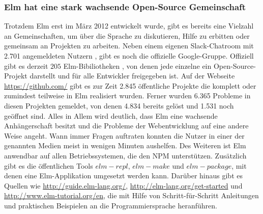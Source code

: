\subsubsection{Elm hat eine stark wachsende Open-Source Gemeinschaft}
Trotzdem Elm erst im März 2012 entwickelt wurde, gibt es bereits eine Vielzahl an Gemeinschaften, um über die Sprache zu diskutieren, Hilfe zu erbitten oder gemeinsam an Projekten zu arbeiten. Neben einem eigenen Slack-Chatroom mit 2.701 angemeldeten Nutzern \cite[vgl.]{slack-user}, gibt es noch die offizielle Google-Gruppe. Offiziell gibt es derzeit $205$ Elm-Bibiliotheken \cite[vgl.]{elm-package}, von denen jede einzelne ein Open-Source-Projekt darstellt und für alle Entwickler freigegeben ist. Auf der Webseite \url{https://github.com/} gibt es zur Zeit 2.845 öffentliche Projekte \cite[vgl.]{elm-repositories} die komplett oder zumindest teilweise in Elm realisiert wurden. Ferner wurden 6.365 Probleme in diesen Projekten gemeldet, von denen 4.834 bereits gelöst und 1.531 noch geöffnet sind.  Alles in Allem wird deutlich, dass Elm eine wachsende Anhängerschaft besitzt und die Probleme der Webentwicklung auf eine andere Weise angeht. Wann immer Fragen auftraten konnten die Nutzer in einer der genannten Medien meist in wenigen Minuten aushelfen. Des Weiteren ist Elm anwendbar auf allen Betriebssystemen, die den \ac{NPM} unterstützen. Zusätzlich gibt es die öffentlichen Tools $elm-repl$, $elm-make$ und $elm-package$, mit denen eine Elm-Applikation umgesetzt werden kann. Darüber hinaus gibt es Quellen wie \url{http://guide.elm-lang.org/}, \url{http://elm-lang.org/get-started} und \url{http://www.elm-tutorial.org/en}, die mit Hilfe von Schritt-für-Schritt Anleitungen und praktischen Beispielen an die Programmiersprache heranführen.


